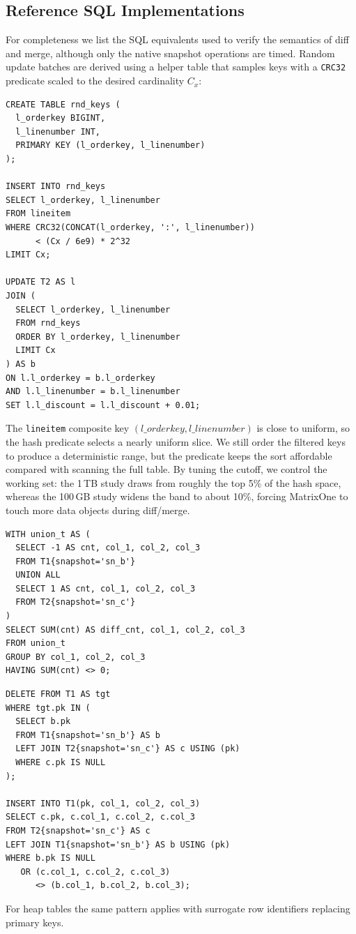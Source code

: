 \documentclass[sigconf,nonacm]{acmart} %
\begin{document}
\subsection{Reference SQL Implementations}
For completeness we list the SQL equivalents used to verify the
semantics of diff and merge, although only the native snapshot
operations are timed.  Random update batches are derived using a helper
table that samples keys with a \texttt{CRC32} predicate scaled to the
desired cardinality $C_x$:
\begin{lstlisting}[label=lst:random-keys,caption=Sampling Keys for Update Batches]
CREATE TABLE rnd_keys (
  l_orderkey BIGINT,
  l_linenumber INT,
  PRIMARY KEY (l_orderkey, l_linenumber)
);

INSERT INTO rnd_keys
SELECT l_orderkey, l_linenumber
FROM lineitem
WHERE CRC32(CONCAT(l_orderkey, ':', l_linenumber))
      < (Cx / 6e9) * 2^32
LIMIT Cx;

UPDATE T2 AS l
JOIN (
  SELECT l_orderkey, l_linenumber
  FROM rnd_keys
  ORDER BY l_orderkey, l_linenumber
  LIMIT Cx
) AS b
ON l.l_orderkey = b.l_orderkey
AND l.l_linenumber = b.l_linenumber
SET l.l_discount = l.l_discount + 0.01;
\end{lstlisting}
The \texttt{lineitem} composite key $(l\_orderkey,l\_linenumber)$ is
close to uniform, so the hash predicate selects a nearly uniform slice.
We still order the filtered keys to produce a deterministic range, but
the predicate keeps the sort affordable compared with scanning the full
table.  By tuning the cutoff, we control the working set: the 1\,TB study
draws from roughly the top 5\% of the hash space, whereas the 100\,GB
study widens the band to about 10\%, forcing MatrixOne to touch more data
objects during diff/merge.
\begin{lstlisting}[label=lst:diff-sql,caption=SQL Reference for Diff]
WITH union_t AS (
  SELECT -1 AS cnt, col_1, col_2, col_3
  FROM T1{snapshot='sn_b'}
  UNION ALL
  SELECT 1 AS cnt, col_1, col_2, col_3
  FROM T2{snapshot='sn_c'}
)
SELECT SUM(cnt) AS diff_cnt, col_1, col_2, col_3
FROM union_t
GROUP BY col_1, col_2, col_3
HAVING SUM(cnt) <> 0;
\end{lstlisting}
\begin{lstlisting}[label=lst:merge-sql,caption=SQL Reference for Merge]
DELETE FROM T1 AS tgt
WHERE tgt.pk IN (
  SELECT b.pk
  FROM T1{snapshot='sn_b'} AS b
  LEFT JOIN T2{snapshot='sn_c'} AS c USING (pk)
  WHERE c.pk IS NULL
);

INSERT INTO T1(pk, col_1, col_2, col_3)
SELECT c.pk, c.col_1, c.col_2, c.col_3
FROM T2{snapshot='sn_c'} AS c
LEFT JOIN T1{snapshot='sn_b'} AS b USING (pk)
WHERE b.pk IS NULL
   OR (c.col_1, c.col_2, c.col_3)
      <> (b.col_1, b.col_2, b.col_3);
\end{lstlisting}
For heap tables the same pattern applies with surrogate row identifiers
replacing primary keys.
\end{document}
